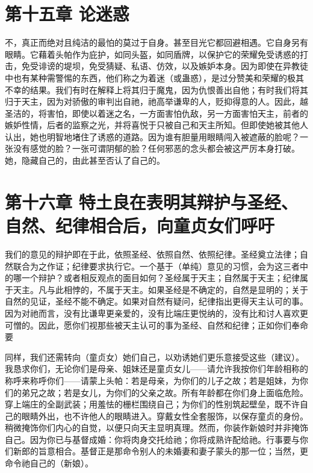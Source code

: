 \section{第十五章 论迷惑}

不，真正而绝对且纯洁的最怕的莫过于自身。甚至目光它都回避相遇。它自身另有眼睛。它藉着头帕作为庇护，如同头盔，如同盾牌，以保护它的荣耀免受诱惑的打击，免受诽谤的堤坝，免受猜疑、私语、仿效，以及嫉妒本身。因为即使在异教徒中也有某种需警惕的东西，他们称之为着迷（或蛊惑），是过分赞美和荣耀的极其不幸的结果。我们有时在解释上将其归于魔鬼，因为仇恨善出自他；有时我们将其归于天主，因为对骄傲的审判出自祂，祂高举谦卑的人，贬抑得意的人。因此，越圣洁的，将害怕，即使以着迷之名，一方面害怕仇敌，另一方面害怕天主，前者的嫉妒性情，后者的监察之光，并将喜悦于只被自己和天主所知。但即使她被其他人认出，她也明智地堵住了诱惑的道路。因为谁有胆量用眼睛闯入被遮蔽的脸呢？一张没有感觉的脸？一张可谓阴郁的脸？任何邪恶的念头都会被这严厉本身打破。她，隐藏自己的，由此甚至否认了自己的。\par


\section{第十六章 特土良在表明其辩护与圣经、自然、纪律相合后，向童贞女们呼吁}

我们的意见的辩护即在于此，依照圣经、依照自然、依照纪律。圣经奠立法律；自然联合为之作证；纪律要求执行它。一个基于（单纯）意见的习惯，会为这三者中的哪一个辩护？或者相反观点的面目如何？圣经属于天主；自然属于天主；纪律属于天主。凡与此相悖的，不属于天主。如果圣经是不确定的，自然是显明的；关于自然的见证，圣经不能不确定。如果对自然有疑问，纪律指出更得天主认可的事。因为对祂而言，没有比谦卑更亲爱的，没有比端庄更悦纳的，没有比和讨人喜欢更可憎的。因此，愿你们视那些被天主认可的事为圣经、自然和纪律；正如你们奉命要\par

同样，我们还需转向（童贞女）她们自己，以劝诱她们更乐意接受这些（建议）。我恳求你们，无论你们是母亲、姐妹还是童贞女儿——请允许我按你们年龄相称的称呼来称呼你们——请蒙上头帕：若是母亲，为你们的儿子之故；若是姐妹，为你们的弟兄之故；若是女儿，为你们的父亲之故。所有年龄都在你们身上面临危险。穿上端庄的全副武装；用羞怯的栅栏围绕自己；为你们的性别筑起壁垒，既不许自己的眼睛外出，也不许他人的眼睛进入。穿戴女性全套服饰，以保存童贞的身份。稍微掩饰你们内心的自觉，以便只向天主显明真理。然而，你装作新娘时并非掩饰自己。因为你已与基督成婚：你将肉身交托给祂；你将成熟许配给祂。行事要与你们新郎的旨意相合。基督正是那命令别人的未婚妻和妻子蒙头的那一位；当然，更命令祂自己的（新娘）。\par

